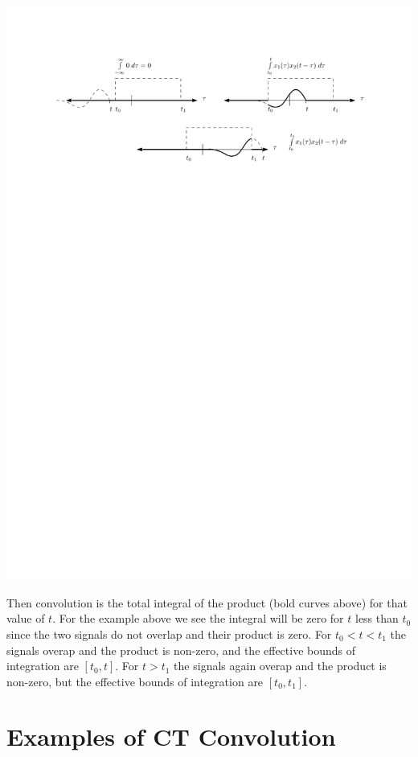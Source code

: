 \begin{center}
  \includegraphics[scale=1]{graphics/convolution-explain4.pdf}
\end{center}
Then convolution is the total integral of the product (bold curves above) for that value of $t$. For the example above we see the integral will be zero for $t$ less than $t_0$ since the two signals do not overlap and their product is zero. For $t_0 < t < t_1$ the signals overap and the product is non-zero, and the effective bounds of integration are $[t_0,t]$. For $t > t_1$ the signals again overap and the product is non-zero, but the effective bounds of integration are $[t_0,t_1]$. 

\section{Examples of CT Convolution}

